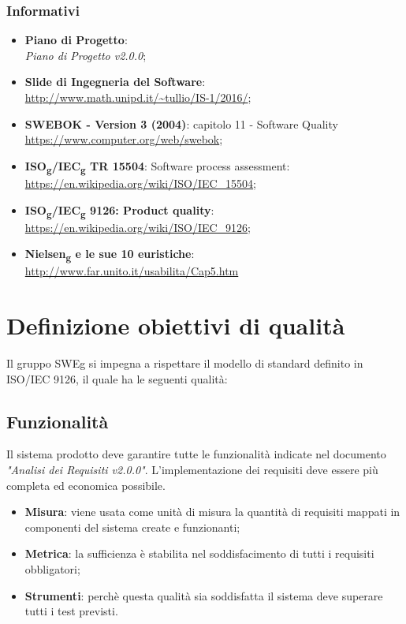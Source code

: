 \documentclass[12pt,a4paper,titlepage]{article}
\begin{document}
	\subsubsection{Informativi}
	\begin{itemize}
		\item \textbf{Piano di Progetto}:\\
		\textit{Piano di Progetto v2.0.0};
		\item \textbf{Slide di Ingegneria del Software}:\\ 
			\textcolor{blue}{\url{http://www.math.unipd.it/~tullio/IS-1/2016/}};
		\item \textbf{SWEBOK - Version 3 (2004)}: capitolo 11 - Software Quality\\
			\textcolor{blue}{\url{https://www.computer.org/web/swebok}};
		\item \textbf{ISO\textsubscript{g}/IEC\textsubscript{g} TR 15504}: Software process assessment:\\
			\textcolor{blue}{\url{https://en.wikipedia.org/wiki/ISO/IEC_15504}};
		\item \textbf{ISO\textsubscript{g}/IEC\textsubscript{g} 9126: Product quality}:\\
			\textcolor{blue}{\url{https://en.wikipedia.org/wiki/ISO/IEC_9126}};
		\item \textbf{Nielsen\textsubscript{g} e le sue 10 euristiche}: \\
			\textcolor{blue}{\url{http://www.far.unito.it/usabilita/Cap5.htm}}
	\end{itemize} 
	
	\newpage
	\section{Definizione obiettivi di qualità}
	Il gruppo SWEg si impegna a rispettare il modello di standard definito in ISO/IEC 9126, il quale ha le seguenti qualità:
		\subsection{Funzionalità}
		Il sistema prodotto deve garantire tutte le funzionalità indicate nel documento \textit{"Analisi dei Requisiti v2.0.0"}. L'implementazione dei requisiti deve essere più completa ed economica possibile.
		\begin{itemize}
			\item \textbf{Misura}: viene usata come unità di misura la quantità di requisiti mappati in componenti del sistema create e funzionanti;
			\item \textbf{Metrica}: la sufficienza è stabilita nel soddisfacimento di tutti i requisiti obbligatori;
			\item \textbf{Strumenti}: perchè questa qualità sia soddisfatta il sistema deve superare tutti i test previsti.
		\end{itemize}
	
\end{document}
